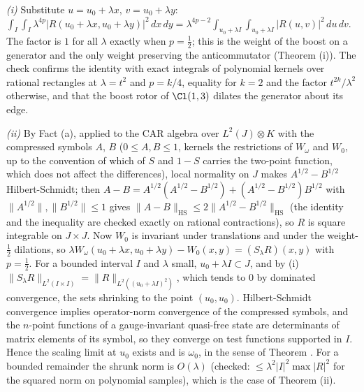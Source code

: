 \emph{(i)} Substitute $u = u_{0} + \lambda x$, $v = u_{0} + \lambda y$: $\int_{I}\int_{I}\lambda^{4p}|R(u_{0} + \lambda x, u_{0} + \lambda y)|^{2}\,dx\,dy = \lambda^{4p - 2}\int_{u_{0} + \lambda I}\int_{u_{0} + \lambda I}|R(u, v)|^{2}\,du\,dv$. The factor is $1$ for all $\lambda$ exactly when $p = \tfrac12$; this is the weight of the boost on a generator and the only weight preserving the anticommutator (Theorem (i)). The check confirms the identity with exact integrals of polynomial kernels over rational rectangles at $\lambda = t^{2}$ and $p = k/4$, equality for $k = 2$ and the factor $t^{2k}/\lambda^{2}$ otherwise, and that the boost rotor of $\Cl(1,3)$ dilates the generator about its edge.

\emph{(ii)} By Fact (a), applied to the CAR algebra over $L^{2}(J)\otimes K$ with the compressed symbols $A$, $B$ ($0 \le A, B \le 1$, kernels the restrictions of $W_{\omega}$ and $W_{0}$, up to the convention of which of $S$ and $1 - S$ carries the two-point function, which does not affect the differences), local normality on $J$ makes $A^{1/2} - B^{1/2}$ Hilbert-Schmidt; then $A - B = A^{1/2}(A^{1/2} - B^{1/2}) + (A^{1/2} - B^{1/2})B^{1/2}$ with $\|A^{1/2}\|, \|B^{1/2}\| \le 1$ gives $\|A - B\|_{\mathrm{HS}} \le 2\|A^{1/2} - B^{1/2}\|_{\mathrm{HS}}$ (the identity and the inequality are checked exactly on rational contractions), so $R$ is square integrable on $J \times J$. Now $W_{0}$ is invariant under translations and under the weight-$\tfrac12$ dilations, so $\lambda W_{\omega}(u_{0} + \lambda x, u_{0} + \lambda y) - W_{0}(x, y) = (S_{\lambda}R)(x, y)$ with $p = \tfrac12$. For a bounded interval $I$ and $\lambda$ small, $u_{0} + \lambda I \subset J$, and by (i) $\|S_{\lambda}R\|_{L^{2}(I \times I)} = \|R\|_{L^{2}((u_{0} + \lambda I)^{2})}$, which tends to $0$ by dominated convergence, the sets shrinking to the point $(u_{0}, u_{0})$. Hilbert-Schmidt convergence implies operator-norm convergence of the compressed symbols, and the $n$-point functions of a gauge-invariant quasi-free state are determinants of matrix elements of its symbol, so they converge on test functions supported in $I$. Hence the scaling limit at $u_{0}$ exists and is $\omega_{0}$, in the sense of Theorem . For a bounded remainder the shrunk norm is $O(\lambda)$ (checked: $\le \lambda^{2}|I|^{2}\max|R|^{2}$ for the squared norm on polynomial samples), which is the case of Theorem (ii).

